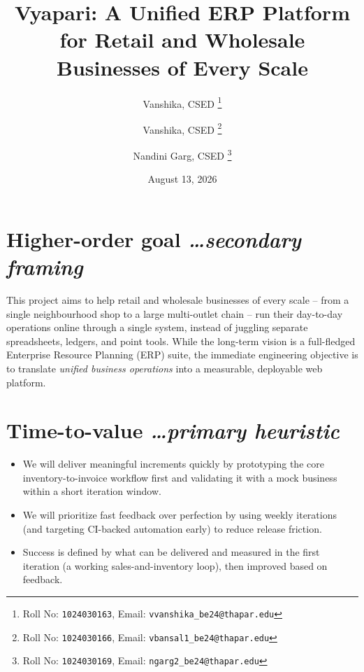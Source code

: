 \documentclass[11pt,a4paper]{article}
\title{Vyapari: A Unified ERP Platform for Retail and Wholesale Businesses of Every Scale}
\author{
  Vanshika, CSED%
  \thanks{Roll No: \texttt{1024030163}, %
    Email: \texttt{vvanshika\_be24@thapar.edu}}
  \and 
  Vanshika, CSED%
  \thanks{Roll No: \texttt{1024030166}, %
    Email: \texttt{vbansal1\_be24@thapar.edu}}
  \and 
  Nandini Garg, CSED%
  \thanks{Roll No: \texttt{1024030169}, %
    Email: \texttt{ngarg2\_be24@thapar.edu}}
}
\date{August 13, 2026}
\newcommand{\BvrHint}[1]{%
  {\normalfont\normalsize\itshape\hfill #1}}
\begin{document}
\maketitle

\section{Higher-order goal%
  \BvrHint{\ldots secondary framing}}
This project aims to help retail and wholesale businesses of every scale -- from a single neighbourhood shop to a large multi-outlet chain -- run their day-to-day operations
online through a single system, instead of juggling
separate spreadsheets, ledgers, and point tools. While the
long-term vision is a full-fledged Enterprise Resource
Planning (ERP) suite, the immediate engineering objective
is to translate \emph{unified business operations} into a
measurable, deployable web platform.

\section{Time-to-value %
\BvrHint{\ldots primary heuristic}}
\begin{itemize}[leftmargin=0.7cm]
    \item We will deliver meaningful increments quickly by prototyping the core inventory-to-invoice workflow first and validating it with a mock business within a short iteration window.
    \item We will prioritize fast feedback over perfection by using weekly iterations (and targeting CI-backed automation early) to reduce release friction.
    \item Success is defined by what can be delivered and measured in the first iteration (a working sales-and-inventory loop), then improved based on feedback.
\end{itemize}
\end{document}
